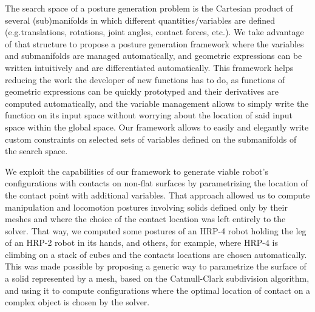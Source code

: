 The search space of a posture generation problem is the Cartesian product of several (sub)manifolds in which different quantities/variables are defined (e.g.translations, rotations, joint angles, contact forces, etc.).
We take advantage of that structure to propose a posture generation framework where the variables and submanifolds are managed automatically, and geometric expressions can be written intuitively and are differentiated automatically.
This framework helps reducing the work the developer of new functions has to do, as functions of geometric expressions can be quickly prototyped and their derivatives are computed automatically, and the variable management allows to simply write the function on its input space without worrying about the location of said input space within the global space.
Our framework allows to easily and elegantly write custom constraints on selected sets of variables defined on the submanifolds of the search space.

We exploit the capabilities of our framework to generate viable robot's configurations with contacts on non-flat surfaces by parametrizing the location of the contact point with additional variables.
That approach allowed us to compute manipulation and locomotion postures involving solids defined only by their meshes and where the choice of the contact location was left entirely to the solver.
That way, we computed some postures of an HRP-4 robot holding the leg of an HRP-2 robot in its hands, and others, for example, where HRP-4 is climbing on a stack of cubes and the contacts locations are chosen automatically.
This was made possible by proposing a generic way to parametrize the surface of a solid represented by a mesh, based on the Catmull-Clark subdivision algorithm, and using it to compute configurations where the optimal location of contact on a complex object is chosen by the solver.

